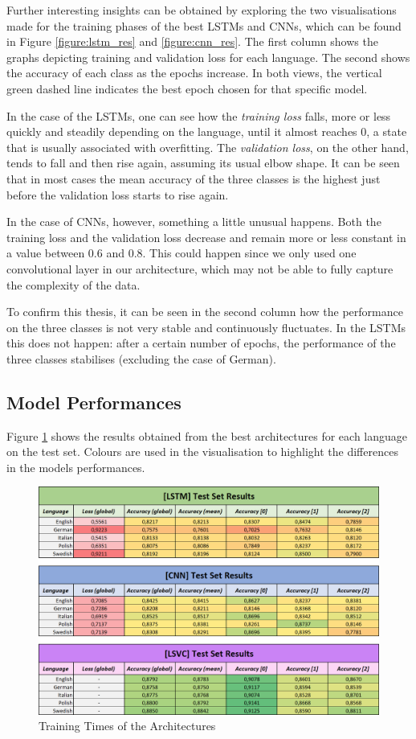 \documentclass[letterpaper,11pt]{article}
\begin{document}
Further interesting insights can be obtained by exploring the two visualisations made for the training phases of the best LSTMs and CNNs, which can be found in Figure \ref{figure:lstm_res} and  \ref{figure:cnn_res}. The first column shows the graphs depicting training and validation loss for each language. The second shows the accuracy of each class as the epochs increase. In both views, the vertical green dashed line indicates the best epoch chosen for that specific model. 

In the case of the LSTMs, one can see how the \textit{training loss} falls, more or less quickly and steadily depending on the language, until it almost reaches 0, a state that is usually associated with overfitting. The \textit{validation loss}, on the other hand, tends to fall and then rise again, assuming its usual elbow shape. It can be seen that in most cases the mean accuracy of the three classes is the highest just before the validation loss starts to rise again.

In the case of CNNs, however, something a little unusual happens. Both the training loss and the validation loss decrease and remain more or less constant in a value between 0.6 and 0.8. This could happen since we only used one convolutional layer in our architecture, which may not be able to fully capture the complexity of the data.

To confirm this thesis, it can be seen in the second column how the performance on the three classes is not very stable and continuously fluctuates. In the LSTMs this does not happen: after a certain number of epochs, the performance of the three classes stabilises (excluding the case of German).  

\subsection{Model Performances}

Figure \ref{fig:results} shows the results obtained from the best architectures for each language on the test set. Colours are used in the visualisation to highlight the differences in the models performances.  

\begin{figure}[H]
  \centering
  \includegraphics[width=\textwidth]{results.png}
  \caption{Training Times of the Architectures}
  \label{fig:results}
\end{figure}
\end{document}
